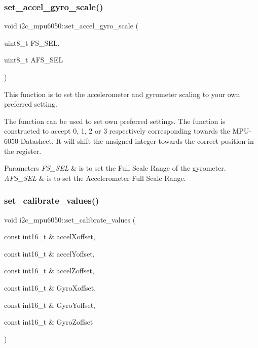 \subsubsection{\texorpdfstring{set\+\_\+accel\+\_\+gyro\+\_\+scale()}{set\_accel\_gyro\_scale()}}
{\footnotesize\ttfamily void i2c\+\_\+mpu6050\+::set\+\_\+accel\+\_\+gyro\+\_\+scale (\begin{DoxyParamCaption}\item[{uint8\+\_\+t}]{F\+S\+\_\+\+S\+EL,  }\item[{uint8\+\_\+t}]{A\+F\+S\+\_\+\+S\+EL }\end{DoxyParamCaption})}



This function is to set the accelerometer and gyrometer scaling to your own preferred setting. 

The function can be used to set own preferred settings. The function is constructed to accept 0, 1, 2 or 3 respectively corresponding towards the M\+P\+U-\/6050 Datasheet. It will shift the unsigned integer towards the correct position in the register. 
\begin{DoxyParams}{Parameters}
{\em F\+S\+\_\+\+S\+EL} & is to set the Full Scale Range of the gyrometer. \\
\hline
{\em A\+F\+S\+\_\+\+S\+EL} & is to set the Accelerometer Full Scale Range. \\
\hline
\end{DoxyParams}
\mbox{\label{classi2c__mpu6050_a232b262d69cb592aa65a1ed334104cc1}} 
\subsubsection{\texorpdfstring{set\+\_\+calibrate\+\_\+values()}{set\_calibrate\_values()}}
{\footnotesize\ttfamily void i2c\+\_\+mpu6050\+::set\+\_\+calibrate\+\_\+values (\begin{DoxyParamCaption}\item[{const int16\+\_\+t \&}]{accel\+Xoffset,  }\item[{const int16\+\_\+t \&}]{accel\+Yoffset,  }\item[{const int16\+\_\+t \&}]{accel\+Zoffset,  }\item[{const int16\+\_\+t \&}]{Gyro\+Xoffset,  }\item[{const int16\+\_\+t \&}]{Gyro\+Yoffset,  }\item[{const int16\+\_\+t \&}]{Gyro\+Zoffset }\end{DoxyParamCaption})}



